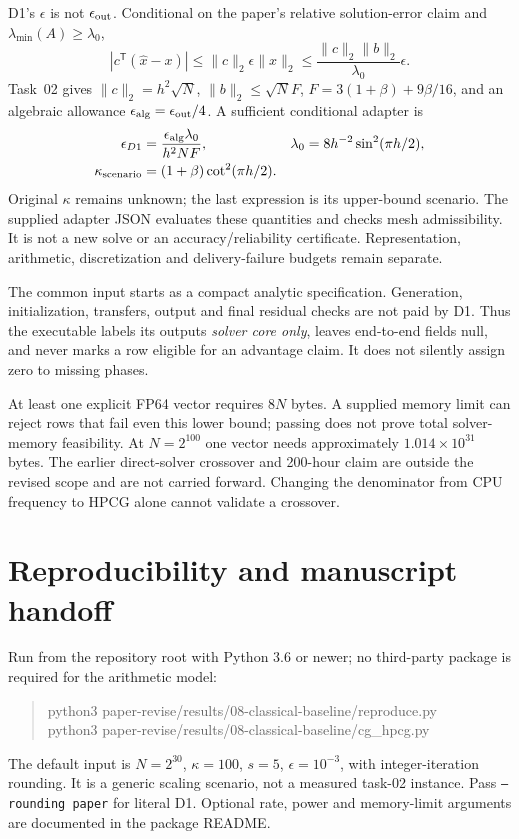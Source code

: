 \documentclass[11pt,a4paper]{article}
\newcommand{\norm}[1]{\lVert#1\rVert}
\begin{document}
D1's $\epsilon$ is not $\epsilon_{\rm out}$. Conditional on the paper's relative solution-error claim and $\lambda_{\min}(A)\ge\lambda_0$,
\begin{equation}
 |c^{\mathsf T}(\widehat x-x)|\le\norm c_2\epsilon\norm x_2
 \le\frac{\norm c_2\norm b_2}{\lambda_0}\epsilon.
\end{equation}
Task~02 gives $\norm c_2=h^2\sqrt N$, $\norm b_2\le\sqrt N F$, $F=3(1+\beta)+9\beta/16$, and an algebraic allowance $\epsilon_{\rm alg}=\epsilon_{\rm out}/4$. A sufficient conditional adapter is
\begin{align}
 \epsilon_{D1}&=\frac{\epsilon_{\rm alg}\lambda_0}{h^2NF},&
 \lambda_0&=8h^{-2}\sin^2(\pi h/2),\\
 \kappa_{\rm scenario}&=(1+\beta)\cot^2(\pi h/2).
\end{align}
Original $\kappa$ remains unknown; the last expression is its upper-bound scenario. The supplied adapter JSON evaluates these quantities and checks mesh admissibility. It is not a new solve or an accuracy/reliability certificate. Representation, arithmetic, discretization and delivery-failure budgets remain separate.

The common input starts as a compact analytic specification. Generation, initialization, transfers, output and final residual checks are not paid by D1. Thus the executable labels its outputs \emph{solver core only}, leaves end-to-end fields null, and never marks a row eligible for an advantage claim. It does not silently assign zero to missing phases.

At least one explicit FP64 vector requires $8N$ bytes. A supplied memory limit can reject rows that fail even this lower bound; passing does not prove total solver-memory feasibility. At $N=2^{100}$ one vector needs approximately $1.014\times10^{31}$ bytes. The earlier direct-solver crossover and 200-hour claim are outside the revised scope and are not carried forward. Changing the denominator from CPU frequency to HPCG alone cannot validate a crossover.

\section{Reproducibility and manuscript handoff}
Run from the repository root with Python 3.6 or newer; no third-party package is required for the arithmetic model:
\begin{quote}\small\ttfamily
python3 paper-revise/results/08-classical-baseline/reproduce.py\\
python3 paper-revise/results/08-classical-baseline/cg\_hpcg.py
\end{quote}
The default input is $N=2^{30}$, $\kappa=100$, $s=5$, $\epsilon=10^{-3}$, with integer-iteration rounding. It is a generic scaling scenario, not a measured task-02 instance. Pass \texttt{--rounding paper} for literal D1. Optional rate, power and memory-limit arguments are documented in the package README.
\end{document}
